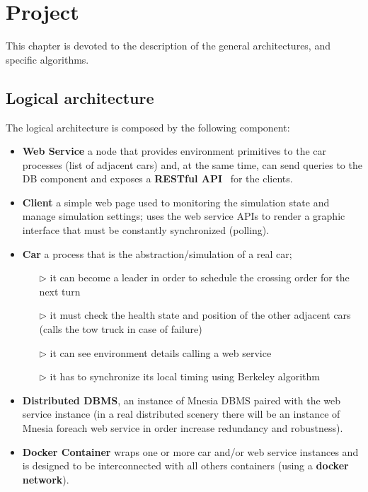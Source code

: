 \chapter{Project}\label{ch:project}

This chapter is devoted to the description of the general architectures, 
and specific algorithms.


\section{Logical architecture}

The logical architecture is composed by the following component:
\begin{itemize}
    \item \textbf{Web Service} a node that provides environment primitives to the 
        car processes (list of adjacent cars) and, at the same time, 
        can send queries to the DB component and exposes a \textbf{RESTful API}~\cite{9} 
        for the clients.
    \item \textbf{Client} a simple web page used to monitoring the simulation state
        and manage simulation settings; uses the web service APIs to render a 
        graphic interface that must be constantly synchronized (polling).
    \item \textbf{Car} a process that is the abstraction/simulation of a real car; 
        \begin{itemize}
            \item[$\rhd$] it can become a leader in order to schedule the crossing 
                order for the next turn
            \item[$\rhd$] it must check the health state and position of the other adjacent cars 
                (calls the tow truck in case of failure)
            \item[$\rhd$] it can see environment details calling a web service 
            \item[$\rhd$] it has to synchronize its local timing using Berkeley algorithm
        \end{itemize}
    \item \textbf{Distributed DBMS}, an instance of Mnesia DBMS paired 
        with the web service instance 
        (in a real distributed scenery there will be an instance of Mnesia 
        foreach web service in order increase redundancy and robustness). 
    \item \textbf{Docker Container} wraps one or more car and/or web service instances 
        and is designed to be interconnected with all others containers 
        (using a \textbf{docker network}). 
    \end{itemize}


